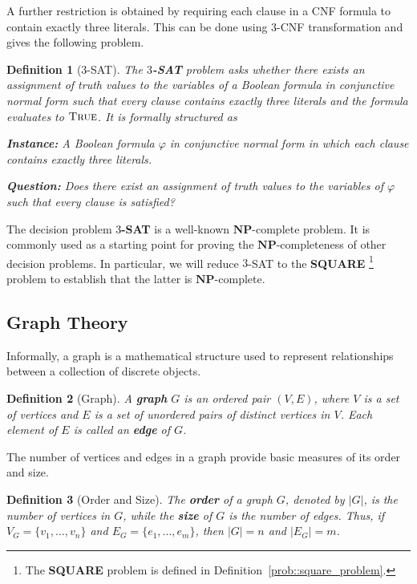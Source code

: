 \documentclass[11pt]{report}
\newtheorem{definition}{Definition}[section]
\begin{document}
A further restriction is obtained by requiring each clause in a CNF formula to contain exactly three literals. This can be done using $3$-CNF transformation and gives the following problem.

\begin{definition}[$3$-SAT] \label{def::3SAT}
  The \textbf{$3$-SAT} problem asks whether there exists an assignment of truth values to the variables of a Boolean formula in conjunctive normal form such that every clause contains exactly three literals and the formula evaluates to $\textsc{True}$. It is formally structured as
  \leavevmode

  \textbf{Instance:} A Boolean formula $\varphi$ in conjunctive normal form in which each clause contains exactly three literals.
  \medskip

  \textbf{Question:} Does there exist an assignment of truth values to the variables of $\varphi$ such that every clause is satisfied?
\end{definition}

The decision problem \textbf{$3$-SAT} is a well-known $\mathbf{NP}$-complete problem. It is commonly used as a starting point for proving the $\mathbf{NP}$-completeness of other decision problems. In particular, we will reduce $3$-SAT to the \textbf{SQUARE} \footnote{The \textbf{SQUARE} problem is defined in
Definition~\ref{prob::square_problem}.} problem to establish that the latter is $\mathbf{NP}$-complete.

\subsection{Graph Theory} \label{subsec::graph_theory}

Informally, a graph is a mathematical structure used to represent relationships between a collection of discrete objects.

\begin{definition}[Graph] \label{def::graph}
  A \textbf{graph} $G$ is an ordered pair $(V,E)$, where $V$ is a set of vertices and $E$ is a set of unordered pairs of distinct vertices in $V$. Each element of $E$ is called an \textbf{edge} of $G$.
\end{definition}

The number of vertices and edges in a graph provide basic measures of its order and size.

\begin{definition}[Order and Size] \label{def::order_size}
  The \textbf{order} of a graph $G$, denoted by $|G|$, is the number of vertices in $G$, while the \textbf{size} of $G$ is the number of edges. Thus, if $V_G=\{v_1,\ldots,v_n\}$ and $E_G=\{e_1,\ldots,e_m\}$, then $|G|=n$ and $|E_G|=m$.
\end{definition}
\end{document}
